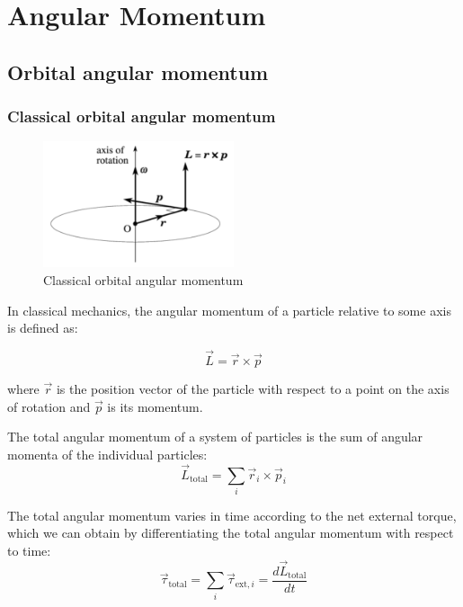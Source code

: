 \section{Angular Momentum}

\subsection{Orbital angular momentum}

\subsubsection{Classical orbital angular momentum}

\begin{figure}
  \centering
  \includegraphics[width=0.5\textwidth]{images/classical_angular_momentum.png}
  \caption{Classical orbital angular momentum}
  \label{fig:classical_angular_momentum}
\end{figure}

In classical mechanics, the angular momentum of a particle relative to some axis is defined as:

\begin{equation}
    \vec{L} = \vec{r} \times \vec{p}
\end{equation}

where $\vec{r}$ is the position vector of the particle with respect to a point on the axis of rotation and $\vec{p}$ is its momentum. 

The total angular momentum of a system of particles is the sum of angular momenta of the individual particles:
\begin{equation}
    \vec{L}_\text{total} = \sum_i \vec{r}_i \times \vec{p}_i
\end{equation}

The total angular momentum varies in time according to the net external torque, which we can obtain by differentiating the total angular momentum with respect to time:
\begin{equation}
    \vec{\tau}_\text{total} = \sum_i \vec{\tau}_{\text{ext},i} = \frac{d\vec{L}_\text{total}}{dt}
\end{equation}

